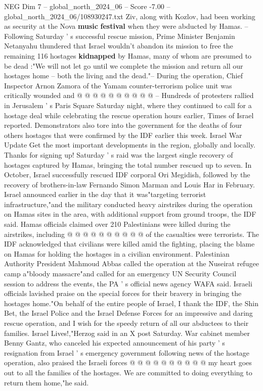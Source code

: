 \begin{textsample}{NEG Dim 7 – global\_north\_2024\_06 – Score -7.00 – global\_north\_2024\_06/108930247.txt}
Ziv, along with Kozlov, had been working as security at the Nova \textbf{music} \textbf{festival} when they were abducted by Hamas. -- Following Saturday ' s successful rescue mission, Prime Minister Benjamin Netanyahu thundered that Israel wouldn't abandon its mission to free the remaining 116 hostages \textbf{kidnapped} by Hamas, many of whom are presumed to be dead :"We will not let go until we complete the mission and return all our hostages home -- both the living and the dead."-- During the operation, Chief Inspector Arnon Zamora of the Yamam counter-terrorism police unit was critically wounded and @ @ @ @ @ @ @ @ @ @ -- Hundreds of protesters rallied in Jerusalem ' s Paris Square Saturday night, where they continued to call for a hostage deal while celebrating the rescue operation hours earlier, Times of Israel reported.
Demonstrators also tore into the government for the deaths of four others hostages that were confirmed by the IDF earlier this week.
Israel War Update Get the most important developments in the region, globally and locally.
Thanks for signing up!
Saturday ' s raid was the largest single recovery of hostages captured by Hamas, bringing the total number rescued up to seven.
In October, Israel successfully rescued IDF corporal Ori Megidish, followed by the recovery of brothers-in-law Fernando Simon Marman and Louis Har in February.
Israel announced earlier in the day that it was"targeting terrorist infrastructure,"and the military conducted heavy airstrikes during the operation on Hamas sites in the area, with additional support from ground troops, the IDF said.
Hamas officials claimed over 210 Palestinians were killed during the airstrikes, including @ @ @ @ @ @ @ @ @ @ of the casualties were terrorists.
The IDF acknowledged that civilians were killed amid the fighting, placing the blame on Hamas for holding the hostages in a civilian environment.
Palestinian Authority President Mahmoud Abbas called the operation at the Nuseirat refugee camp a"bloody massacre"and called for an emergency UN Security Council session to address the events, the PA ' s official news agency WAFA said.
Israeli officials lavished praise on the special forces for their bravery in bringing the hostages home."On behalf of the entire people of Israel, I thank the IDF, the Shin Bet, the Israel Police and the Israel Defense Forces for an impressive and daring rescue operation, and I wish for the speedy return of all our abductees to their families.
Israel Lives!,"Herzog said in an X post Saturday.
War cabinet member Benny Gantz, who canceled his expected announcement of his party ' s resignation from Israel ' s emergency government following news of the hostage operation, also praised the Israeli forces @ @ @ @ @ @ @ @ @ @ my heart goes out to all the families of the hostages.
We are committed to doing everything to return them home,"he said.

\end{textsample}
